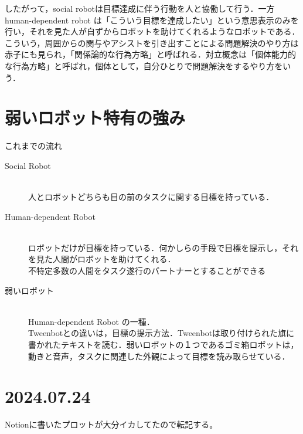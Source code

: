 \documentclass[fleqn,twocolumn]{mynote}
\begin{document}
  したがって，social robotは目標達成に伴う行動を人と協働して行う．一方human-dependent robot
  は「こういう目標を達成したい」という意思表示のみを行い，それを見た人が自ずからロボットを助けてくれるようなロボットである\cite{Yamaji-2010-STBHumandependentSociableTrash}．こういう，周囲からの関与やアシストを引き出すことによる問題解決のやり方は赤子にも見られ，「関係論的な行為方略」と呼ばれる\cite{岡田美智男-2012-ゴミ箱ロ}．対立概念は「個体能力的な行為方略」と呼ばれ，個体として，自分ひとりで問題解決をするやり方をいう．

  \section*{弱いロボット特有の強み}
  これまでの流れ
  \begin{description}
    \item[Social Robot]\mbox{}\\
      人とロボットどちらも目の前のタスクに関する目標を持っている\cite{Breazeal-2004-SocialInteractionsHRIRobot}．
    \item[Human-dependent Robot]\mbox{}\\
      ロボットだけが目標を持っている．何かしらの手段で目標を提示し，それを見た人間がロボットを助けてくれる．\\
      \Rightarrow 不特定多数の人間をタスク遂行のパートナーとすることができる\cite{--TweenbotsKacieKinzer}
    \item[弱いロボット]\mbox{}\\
      Human-dependent Robot の一種． \\
      Tweenbotとの違いは，目標の提示方法．Tweenbotは取り付けられた旗に書かれたテキストを読む．弱いロボットの１つであるゴミ箱ロボットは，動きと音声，タスクに関連した外観によって目標を読み取らせている．\\
  \end{description}

  \section{2024.07.24}

  Notionに書いたプロットが大分イカしてたので転記する。
\end{document}

